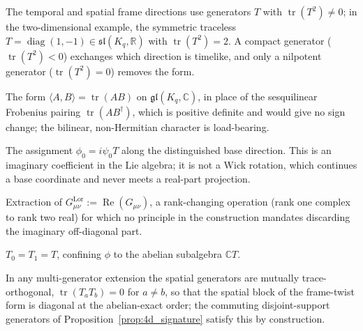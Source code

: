 \renewcommand{\thepostulate}{P4.\arabic{postulate}}
\begin{postulate}\label{post:noncompact}
The temporal and spatial frame directions use generators $T$ with $\operatorname{tr}(T^2) \neq 0$; in the two-dimensional example, the symmetric traceless $T = \operatorname{diag}(1,-1) \in \mathfrak{sl}(K_q,\mathbb{R})$ with $\operatorname{tr}(T^2) = 2$. A compact generator ($\operatorname{tr}(T^2) < 0$) exchanges which direction is timelike, and only a nilpotent generator ($\operatorname{tr}(T^2) = 0$) removes the form.
\end{postulate}
\begin{postulate}\label{post:pairing}
The form $\langle A, B\rangle = \operatorname{tr}(AB)$ on $\mathfrak{gl}(K_q,\mathbb{C})$, in place of the sesquilinear Frobenius pairing $\operatorname{tr}(AB^\dagger)$, which is positive definite and would give no sign change; the bilinear, non-Hermitian character is load-bearing.
\end{postulate}
\begin{postulate}\label{post:imaginary}
The assignment $\phi_0 = i\psi_0 T$ along the distinguished base direction. This is an imaginary coefficient in the Lie algebra; it is not a Wick rotation, which continues a base coordinate and never meets a real-part projection.
\end{postulate}
\begin{postulate}\label{post:realpart}
Extraction of $G^{\mathrm{Lor}}_{\mu\nu} := \operatorname{Re}(G_{\mu\nu})$, a rank-changing operation (rank one complex to rank two real) for which no principle in the construction mandates discarding the imaginary off-diagonal part.
\end{postulate}
\begin{postulate}\label{post:collapse}
$T_0 = T_1 = T$, confining $\phi$ to the abelian subalgebra $\mathbb{C}T$.
\end{postulate}
\begin{postulate}\label{post:traceorth}
In any multi-generator extension the spatial generators are mutually trace-orthogonal, $\operatorname{tr}(T_a T_b) = 0$ for $a \neq b$, so that the spatial block of the frame-twist form is diagonal at the abelian-exact order; the commuting disjoint-support generators of Proposition~\ref{prop:4d_signature} satisfy this by construction.
\end{postulate}

